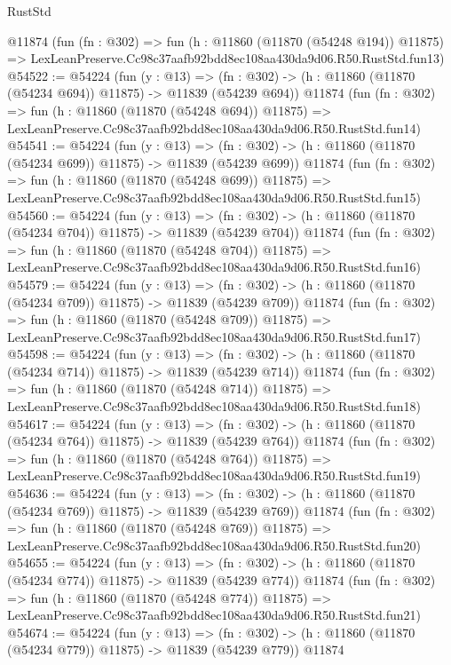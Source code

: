 \begin{lexlean}{RustStd}
\begin{coremodule}
    @11874
    (fun (fn : @302) =>
    fun (h : @11860 (@11870 (@54248 @194)) @11875) =>
    LexLeanPreserve.Cc98c37aafb92bdd8ec108aa430da9d06.R50.RustStd.fun13)
@54522 := @54224
    (fun (y : @13) =>
    (fn : @302) -> (h : @11860 (@11870 (@54234 @694)) @11875) -> @11839 (@54239 @694))
    @11874
    (fun (fn : @302) =>
    fun (h : @11860 (@11870 (@54248 @694)) @11875) =>
    LexLeanPreserve.Cc98c37aafb92bdd8ec108aa430da9d06.R50.RustStd.fun14)
@54541 := @54224
    (fun (y : @13) =>
    (fn : @302) -> (h : @11860 (@11870 (@54234 @699)) @11875) -> @11839 (@54239 @699))
    @11874
    (fun (fn : @302) =>
    fun (h : @11860 (@11870 (@54248 @699)) @11875) =>
    LexLeanPreserve.Cc98c37aafb92bdd8ec108aa430da9d06.R50.RustStd.fun15)
@54560 := @54224
    (fun (y : @13) =>
    (fn : @302) -> (h : @11860 (@11870 (@54234 @704)) @11875) -> @11839 (@54239 @704))
    @11874
    (fun (fn : @302) =>
    fun (h : @11860 (@11870 (@54248 @704)) @11875) =>
    LexLeanPreserve.Cc98c37aafb92bdd8ec108aa430da9d06.R50.RustStd.fun16)
@54579 := @54224
    (fun (y : @13) =>
    (fn : @302) -> (h : @11860 (@11870 (@54234 @709)) @11875) -> @11839 (@54239 @709))
    @11874
    (fun (fn : @302) =>
    fun (h : @11860 (@11870 (@54248 @709)) @11875) =>
    LexLeanPreserve.Cc98c37aafb92bdd8ec108aa430da9d06.R50.RustStd.fun17)
@54598 := @54224
    (fun (y : @13) =>
    (fn : @302) -> (h : @11860 (@11870 (@54234 @714)) @11875) -> @11839 (@54239 @714))
    @11874
    (fun (fn : @302) =>
    fun (h : @11860 (@11870 (@54248 @714)) @11875) =>
    LexLeanPreserve.Cc98c37aafb92bdd8ec108aa430da9d06.R50.RustStd.fun18)
@54617 := @54224
    (fun (y : @13) =>
    (fn : @302) -> (h : @11860 (@11870 (@54234 @764)) @11875) -> @11839 (@54239 @764))
    @11874
    (fun (fn : @302) =>
    fun (h : @11860 (@11870 (@54248 @764)) @11875) =>
    LexLeanPreserve.Cc98c37aafb92bdd8ec108aa430da9d06.R50.RustStd.fun19)
@54636 := @54224
    (fun (y : @13) =>
    (fn : @302) -> (h : @11860 (@11870 (@54234 @769)) @11875) -> @11839 (@54239 @769))
    @11874
    (fun (fn : @302) =>
    fun (h : @11860 (@11870 (@54248 @769)) @11875) =>
    LexLeanPreserve.Cc98c37aafb92bdd8ec108aa430da9d06.R50.RustStd.fun20)
@54655 := @54224
    (fun (y : @13) =>
    (fn : @302) -> (h : @11860 (@11870 (@54234 @774)) @11875) -> @11839 (@54239 @774))
    @11874
    (fun (fn : @302) =>
    fun (h : @11860 (@11870 (@54248 @774)) @11875) =>
    LexLeanPreserve.Cc98c37aafb92bdd8ec108aa430da9d06.R50.RustStd.fun21)
@54674 := @54224
    (fun (y : @13) =>
    (fn : @302) -> (h : @11860 (@11870 (@54234 @779)) @11875) -> @11839 (@54239 @779))
    @11874

\end{coremodule}
\end{lexlean}
